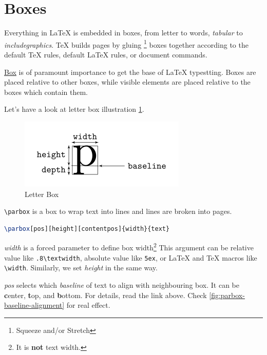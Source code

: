 \section{Boxes}
\label{sec:boxes}

Everything in \LaTeX{} is embedded in boxes, from letter to words,
\textit{tabular} to \textit{includegraphics}. TeX builds pages by
gluing \footnote{Squeeze and/or Stretch} boxes together according
to the default \TeX{} rules, default \LaTeX{} rules, or document
commands.

\href{https://en.wikibooks.org/wiki/LaTeX/Boxes}{Box} is of
paramount importance to get the base of \LaTeX{} typestting. Boxes
are placed relative to other boxes, while visible elements are
placed relative to the boxes which contain them.

Let's have a look at letter box illustration \ref{fig:letter-box}.

\begin{figure}[!htbp]
  \centering
  \includegraphics[width=.5\textwidth]{letter_box}
  \caption{Letter Box}
  \label{fig:letter-box}
\end{figure}

\verb|\parbox| is a box to wrap text into lines and lines are
broken into pages.

\begin{lstlisting}[language=TeX,caption={parbox box},label={lst:parbox-box}]
\parbox[pos][height][contentpos]{width}{text}
\end{lstlisting}

\textit{width} is a forced parameter to define box
width\footnote{It is \textbf{not} text width.} This argument can
be relative value like \verb|.8\textwidth|, absolute value like
\verb|5ex|, or \LaTeX{} and \TeX{} macros like
\verb|\width|. Similarly, we set \textit{height} in the same way.

\textit{pos} selects which \textit{baseline} of text to align with
neighbouring box. It can be \textbf{c}enter, \textbf{t}op, and
\textbf{b}ottom. For details, read the link above. Check
\ref{fig:parbox-baseline-alignment} for real effect.

